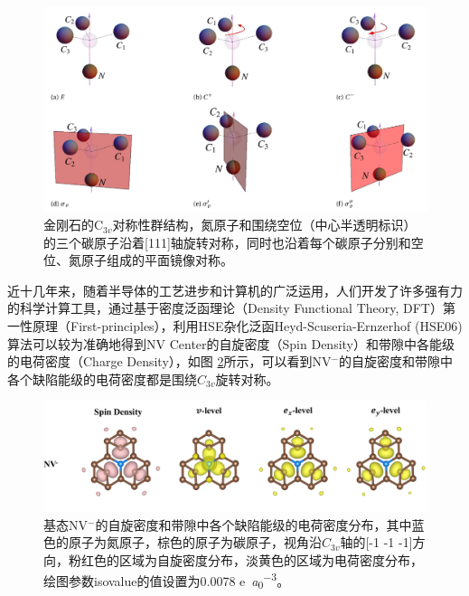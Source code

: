 \documentclass[type = bachelor]{whu-thesis}
\begin{document}
\begin{figure}
  \centering
  \includegraphics[width=1.0\textwidth]{figures/Chapter 1/NV Symmetry.png}
  \caption[金刚石的C$_{3v}$对称性群结构]{金刚石的C$_{3v}$对称性群结构，氮原子和围绕空位（中心半透明标识）的三个碳原子沿着[111]轴旋转对称，同时也沿着每个碳原子分别和空位、氮原子组成的平面镜像对称\cite{doherty2013nitrogen}。}
  \label{fig: NV Symmetry}
\end{figure}

近十几年来，随着半导体的工艺进步和计算机的广泛运用，人们开发了许多强有力的科学计算工具，通过基于密度泛函理论（Density Functional Theory, DFT）第一性原理（First-principles），利用HSE杂化泛函Heyd-Scuseria-Ernzerhof (HSE06)算法可以较为准确地得到NV Center的自旋密度（Spin Density）和带隙中各能级的电荷密度（Charge Density），如图 \ref{fig: Spin and Charge Density}所示，可以看到NV$^-$的自旋密度和带隙中各个缺陷能级的电荷密度都是围绕$C_{3v}$旋转对称\cite{zou2023influence}。

\begin{figure}
  \centering
  \includegraphics[width=1.0\textwidth]{figures/Chapter 1/Spin and Charge Density.png}
  \caption[基态NV$^-$的自旋密度和带隙中各个缺陷能级的电荷密度分布]{基态NV$^-$的自旋密度和带隙中各个缺陷能级的电荷密度分布，其中蓝色的原子为氮原子，棕色的原子为碳原子，视角沿$C_{3v}$轴的[-1 -1 -1]方向，粉红色的区域为自旋密度分布，淡黄色的区域为电荷密度分布，绘图参数isovalue的值设置为0.0078 \unit{e\per\bohr\cubed}\cite{zou2023influence}。}
  \label{fig: Spin and Charge Density}
\end{figure}
\end{document}
